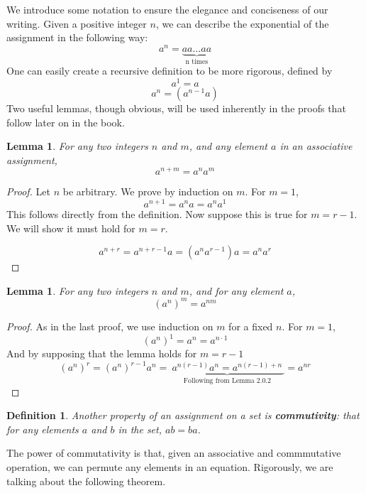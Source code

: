 \documentclass[12pt]{report}
\newtheorem{lemma}[theorem]{Lemma}
\newtheorem{definition}{Definition}
\begin{document}
We introduce some notation to ensure the elegance and conciseness of our writing. Given a positive integer $n$, we can describe the exponential of the assignment in the following way:
%
\[ a^n = \underbrace{aa \dots aa}_\text{n times} \]
%
One can easily create a recursive definition to be more rigorous, defined by
%
\[ a^1 = a \]
\[ a^n = (a^{n-1}a) \]
%
Two useful lemmas, though obvious, will be used inherently in the proofs that follow later on in the book.

\begin{lemma} For any two integers $n$ and $m$, and any element $a$ in an associative assignment,
\[ a^{n+m} = a^n a^m \]
\end{lemma}
\begin{proof}
    Let $n$ be arbitrary. We prove by induction on $m$. For $m = 1$,
    \[ a^{n + 1} = a^n a = a^n a^1 \]
    This follows directly from the definition. Now suppose this is true for $m = r - 1$. We will show it must hold for $m = r$.

    \[ a^{n + r} = a^{n + r - 1} a = (a^n a^{r-1}) a = a^n a^r \]
\end{proof}

\begin{lemma}
    For any two integers $n$ and $m$, and for any element $a$,
    \[ (a^n)^m = a^{nm} \]
\end{lemma}
\begin{proof}
    As in the last proof, we use induction on $m$ for a fixed $n$. For $m = 1$,
    \[ (a^n)^1 = a^n = a^{n \cdotp 1} \]
    And by supposing that the lemma holds for $m = r-1$
    \[ (a^n)^r = (a^n)^{r-1} a^n = \underbrace{\ a^{n(r-1)} a^n = a^{n(r-1) + n}\ }_\text{Following from Lemma 2.0.2} = a^{nr} \]
\end{proof}

\begin{definition} Another property of an assignment on a set is {\bf commutivity}: that for any elements $a$ and $b$ in the set, $ab = ba$.
\end{definition}

The power of commutativity is that, given an associative and commmutative operation, we can permute any elements in an equation. Rigorously, we are talking about the following theorem.
\end{document}
